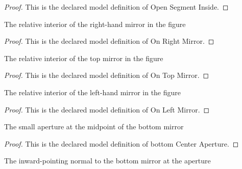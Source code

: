 \begin{proof}
  This is the declared model definition of Open Segment Inside.
\end{proof}
\begin{definition}
  \label{def:physics:phyx-mini-0024:phyxminiproblems-problemphyxmini0024-onrightmirror}
  The relative interior of the right-hand mirror in the figure
\end{definition}
\begin{proof}
  This is the declared model definition of On Right Mirror.
\end{proof}
\begin{definition}
  \label{def:physics:phyx-mini-0024:phyxminiproblems-problemphyxmini0024-ontopmirror}
  The relative interior of the top mirror in the figure
\end{definition}
\begin{proof}
  This is the declared model definition of On Top Mirror.
\end{proof}
\begin{definition}
  \label{def:physics:phyx-mini-0024:phyxminiproblems-problemphyxmini0024-onleftmirror}
  The relative interior of the left-hand mirror in the figure
\end{definition}
\begin{proof}
  This is the declared model definition of On Left Mirror.
\end{proof}
\begin{definition}
  \label{def:physics:phyx-mini-0024:phyxminiproblems-problemphyxmini0024-bottomcenteraperture}
  The small aperture at the midpoint of the bottom mirror
\end{definition}
\begin{proof}
  This is the declared model definition of bottom Center Aperture.
\end{proof}
\begin{definition}
  \label{def:physics:phyx-mini-0024:phyxminiproblems-problemphyxmini0024-inwardnormalataperture}
  The inward-pointing normal to the bottom mirror at the aperture
\end{definition}
